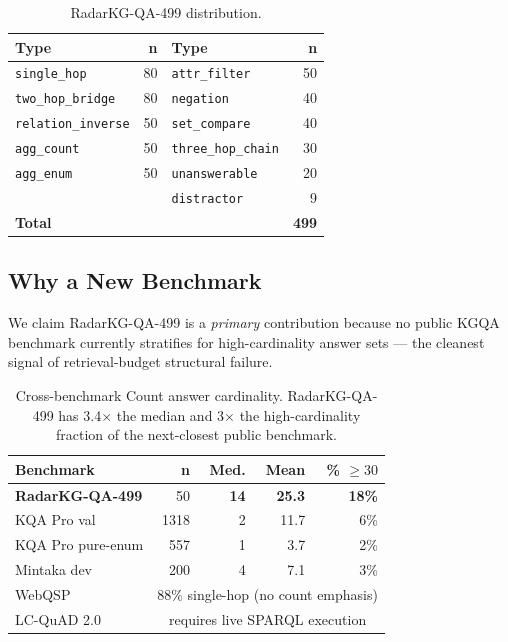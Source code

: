 \documentclass[review]{elsarticle}
\newcommand{\qtype}[1]{\texttt{\small #1}}
\begin{document}
\begin{table}[h]
\centering
\small
\caption{RadarKG-QA-499 distribution.}
\label{tab:qa-dist}
\begin{tabular}{l r l r}
\toprule
\textbf{Type} & \textbf{n} & \textbf{Type} & \textbf{n} \\
\midrule
\qtype{single\_hop}        & 80 & \qtype{attr\_filter}      & 50 \\
\qtype{two\_hop\_bridge}   & 80 & \qtype{negation}          & 40 \\
\qtype{relation\_inverse}  & 50 & \qtype{set\_compare}      & 40 \\
\qtype{agg\_count}         & 50 & \qtype{three\_hop\_chain} & 30 \\
\qtype{agg\_enum}          & 50 & \qtype{unanswerable}      & 20 \\
                           &    & \qtype{distractor}        & 9  \\
\midrule
\multicolumn{3}{l}{\textbf{Total}} & \textbf{499} \\
\bottomrule
\end{tabular}
\end{table}

\subsection{Why a New Benchmark}
\label{sec:bench-design}
We claim RadarKG-QA-499 is a \emph{primary} contribution because no public KGQA benchmark currently stratifies for high-cardinality answer sets --- the cleanest signal of retrieval-budget structural failure.

\begin{table}[h]
\centering
\small
\caption{Cross-benchmark Count answer cardinality. RadarKG-QA-499 has 3.4$\times$ the median and 3$\times$ the high-cardinality fraction of the next-closest public benchmark.}
\label{tab:bench-distribution}
\begin{tabular}{l r r r r}
\toprule
\textbf{Benchmark} & \textbf{n} & \textbf{Med.} & \textbf{Mean} & \textbf{\% $\!\geq\! 30$} \\
\midrule
\textbf{RadarKG-QA-499} & 50 & \textbf{14} & \textbf{25.3} & \textbf{18\%} \\
KQA Pro val            & 1318 & 2 & 11.7 & 6\% \\
KQA Pro pure-enum      & 557 & 1 & 3.7  & 2\% \\
Mintaka dev            & 200 & 4 & 7.1  & 3\% \\
WebQSP                 & \multicolumn{4}{c}{88\% single-hop (no count emphasis)} \\
LC-QuAD 2.0            & \multicolumn{4}{c}{requires live SPARQL execution} \\
\bottomrule
\end{tabular}
\end{table}
\end{document}
